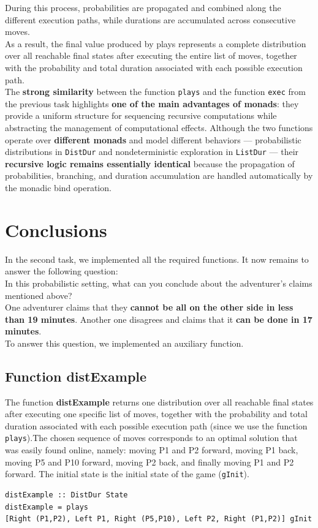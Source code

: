 \documentclass[a4paper,12pt]{report}
\begin{document}
During this process, probabilities are propagated and combined along
the different execution paths, while durations are accumulated across
consecutive moves.
\\[1em]
As a result, the final value produced by plays represents a
complete distribution over all reachable final states after
executing the entire list of moves, together with the probability and
total duration associated with each possible execution path.
\\[1em]
The \textbf{strong similarity} between the function \texttt{plays} and the function
\texttt{exec} from the previous task highlights \textbf{one of the main advantages
of monads}: they provide a uniform structure for sequencing recursive
computations while abstracting the management of computational effects.
Although the two functions operate over \textbf{different monads} and model
different behaviors — probabilistic distributions in \texttt{DistDur} and
nondeterministic exploration in \texttt{ListDur} — their \textbf{recursive logic
remains essentially identical} because the propagation of probabilities,
branching, and duration accumulation are handled automatically by
the monadic bind operation.
\section{Conclusions}
In the second task, we implemented all the required functions.
It now remains to answer the following question:
\\[1em]
In this probabilistic setting, what can you conclude about the
adventurer’s claims mentioned above?
\\[1em]
One adventurer claims that they \textbf{cannot be all on the other
side in less than 19 minutes}. Another
one disagrees and claims that it \textbf{can be done in 17 minutes}.
\\[1em]
To answer this question, we implemented an auxiliary function.
\subsection{Function distExample}
The function \textbf{distExample} returns one distribution over all
reachable final states after executing one specific list of moves,
together with the probability
and total duration associated with each possible execution path (since we use the
function \texttt{plays}).The chosen sequence of moves corresponds to an
optimal solution that was easily found online,
namely: moving P1 and P2 forward, moving P1 back, moving P5 and P10 forward,
moving P2 back, and finally moving P1 and P2 forward. The initial
state is the initial state of the game (\texttt{gInit}).
\begin{verbatim}
distExample :: DistDur State
distExample = plays
[Right (P1,P2), Left P1, Right (P5,P10), Left P2, Right (P1,P2)] gInit
\end{verbatim}
\end{document}
